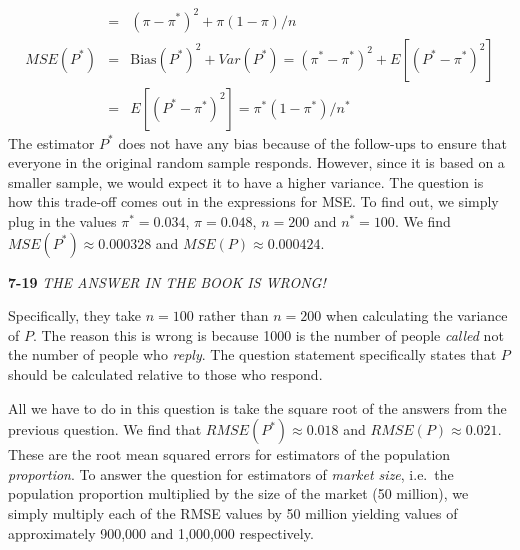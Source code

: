 \documentclass[addpoints,12pt]{exam}\usepackage[]{graphicx}\usepackage[]{color}
\begin{document}
\begin{questions}
\begin{solution}
\begin{eqnarray*}
		&=&  (\pi - \pi^*)^2 + \pi(1-\pi)/n\\
		MSE(P^*)	&=& \mbox{Bias}(P^*)^2 + Var(P^*) = (\pi^* - \pi^*)^2 + E[(P^* - \pi^*)^2]\\
			&=& E[(P^* - \pi^*)^2] = \pi^*(1-\pi^*)/n^*
	\end{eqnarray*}
The estimator $P^*$ does not have any bias because of the follow-ups to ensure that everyone in the original random sample responds. However, since it is based on a smaller sample, we would expect it to have a higher variance. The question is how this trade-off comes out in the expressions for MSE. To find out, we simply plug in the values $\pi^* = 0.034$, $\pi = 0.048$, $n =200$ and $n^* = 100$. We find $MSE(P^*) \approx 0.000328$ and $MSE(P) \approx 0.000424$.
    \end{solution}
  \item[]
    \begin{solution}
    \textbf{7-19} \emph{THE ANSWER IN THE BOOK IS WRONG!}

\noindent Specifically, they take $n=100$ rather than $n = 200$ when calculating the variance of $P$. The reason this is wrong is because 1000 is the number of people \emph{called} not the number of people who \emph{reply}. The question statement specifically states that $P$ should be calculated relative to  those who respond.

All we have to do in this question is take the square root of the answers from the previous question. We find that $RMSE(P^*) \approx 0.018$ and $RMSE(P) \approx 0.021$. These are the root mean squared errors for estimators of the population \emph{proportion}. To answer the question for estimators of \emph{market size}, i.e.\ the population proportion multiplied by the size of the market (50 million), we simply multiply each of the RMSE values by 50 million yielding values of approximately 900,000 and 1,000,000 respectively.

    \end{solution}
\end{questions}
\end{document}
